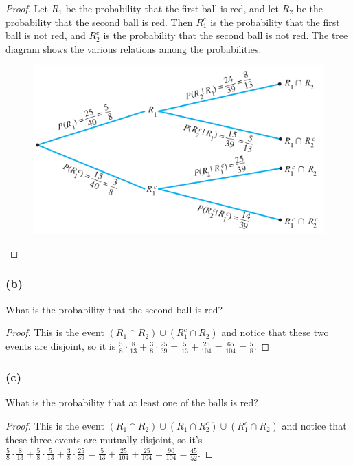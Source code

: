 \documentclass[14pt]{extarticle}
\begin{document}
\begin{proof}
     Let \(R_1\) be the probability that the first ball is red, and let \(R_2\) be the probability that the second ball is red.
     Then \(R_1^c\) is the probability that the first ball is not red, and \(R_2^c\) is the probability that the second ball is
     not red. The tree diagram shows the various relations among the probabilities.

     \begin{figure}[ht!]
          \centering
          \includegraphics[scale=0.5]{../images/9.9.6.a.png}
     \end{figure}
\end{proof}

\subsubsection{(b)}
What is the probability that the second ball is red?
\begin{proof}
     This is the event \((R_1 \cap R_2) \cup (R_1^c \cap R_2)\) and notice that these two events are disjoint, so it is \(\frac{5}
     {8} \cdot \frac{8}{13} + \frac{3}{8} \cdot \frac{25}{39} = \frac{5}{13} + \frac{25}{104} = \frac{65}{104}= \frac{5}{8}\).
\end{proof}

\subsubsection{(c)}
What is the probability that at least one of the balls is red?
\begin{proof}
     This is the event \((R_1 \cap R_2) \cup (R_1 \cap R_2^c) \cup (R_1^c \cap R_2)\) and notice that these three events are
     mutually disjoint, so it's \(\frac{5}{8} \cdot \frac{8}{13} + \frac{5}{8}\cdot\frac{5}{13} + \frac{3}{8} \cdot \frac{25}{39}
     = \frac{5}{13} + \frac{25}{104} + \frac{25}{104} = \frac{90}{104} = \frac{45}{52}\).
\end{proof}
\end{document}
